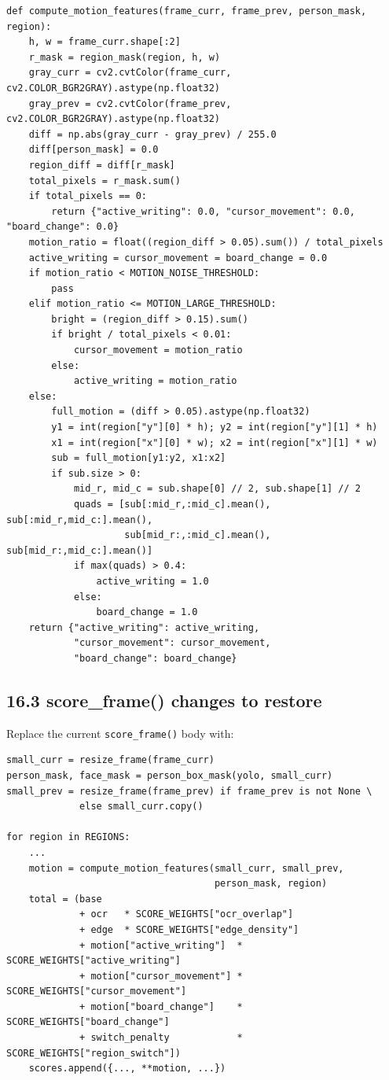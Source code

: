 \documentclass[11pt]{article}
\begin{document}
\begin{verbatim}
def compute_motion_features(frame_curr, frame_prev, person_mask, region):
    h, w = frame_curr.shape[:2]
    r_mask = region_mask(region, h, w)
    gray_curr = cv2.cvtColor(frame_curr, cv2.COLOR_BGR2GRAY).astype(np.float32)
    gray_prev = cv2.cvtColor(frame_prev, cv2.COLOR_BGR2GRAY).astype(np.float32)
    diff = np.abs(gray_curr - gray_prev) / 255.0
    diff[person_mask] = 0.0
    region_diff = diff[r_mask]
    total_pixels = r_mask.sum()
    if total_pixels == 0:
        return {"active_writing": 0.0, "cursor_movement": 0.0, "board_change": 0.0}
    motion_ratio = float((region_diff > 0.05).sum()) / total_pixels
    active_writing = cursor_movement = board_change = 0.0
    if motion_ratio < MOTION_NOISE_THRESHOLD:
        pass
    elif motion_ratio <= MOTION_LARGE_THRESHOLD:
        bright = (region_diff > 0.15).sum()
        if bright / total_pixels < 0.01:
            cursor_movement = motion_ratio
        else:
            active_writing = motion_ratio
    else:
        full_motion = (diff > 0.05).astype(np.float32)
        y1 = int(region["y"][0] * h); y2 = int(region["y"][1] * h)
        x1 = int(region["x"][0] * w); x2 = int(region["x"][1] * w)
        sub = full_motion[y1:y2, x1:x2]
        if sub.size > 0:
            mid_r, mid_c = sub.shape[0] // 2, sub.shape[1] // 2
            quads = [sub[:mid_r,:mid_c].mean(), sub[:mid_r,mid_c:].mean(),
                     sub[mid_r:,:mid_c].mean(), sub[mid_r:,mid_c:].mean()]
            if max(quads) > 0.4:
                active_writing = 1.0
            else:
                board_change = 1.0
    return {"active_writing": active_writing,
            "cursor_movement": cursor_movement,
            "board_change": board_change}
\end{verbatim}

\subsection*{16.3 score\_frame() changes to restore}

Replace the current \texttt{score\_frame()} body with:

\begin{verbatim}
small_curr = resize_frame(frame_curr)
person_mask, face_mask = person_box_mask(yolo, small_curr)
small_prev = resize_frame(frame_prev) if frame_prev is not None \
             else small_curr.copy()

for region in REGIONS:
    ...
    motion = compute_motion_features(small_curr, small_prev,
                                     person_mask, region)
    total = (base
             + ocr   * SCORE_WEIGHTS["ocr_overlap"]
             + edge  * SCORE_WEIGHTS["edge_density"]
             + motion["active_writing"]  * SCORE_WEIGHTS["active_writing"]
             + motion["cursor_movement"] * SCORE_WEIGHTS["cursor_movement"]
             + motion["board_change"]    * SCORE_WEIGHTS["board_change"]
             + switch_penalty            * SCORE_WEIGHTS["region_switch"])
    scores.append({..., **motion, ...})
\end{verbatim}
\end{document}
